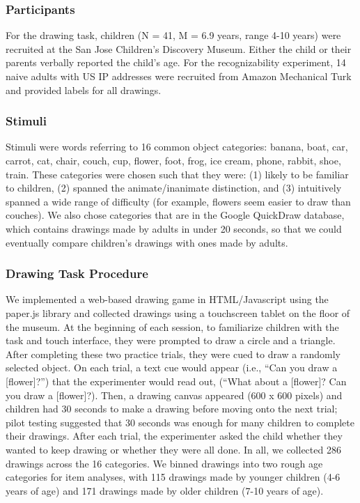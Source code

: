 \documentclass[10pt, letterpaper]{article}
\begin{document}
\subsubsection{Participants}\label{participants}

For the drawing task, children (N = 41, M = 6.9 years, range 4-10 years)
were recruited at the San Jose Children's Discovery Museum. Either the
child or their parents verbally reported the child's age. For the
recognizability experiment, 14 naive adults with US IP addresses were
recruited from Amazon Mechanical Turk and provided labels for all
drawings.

\subsubsection{Stimuli}\label{stimuli}

Stimuli were words referring to 16 common object categories: banana,
boat, car, carrot, cat, chair, couch, cup, flower, foot, frog, ice
cream, phone, rabbit, shoe, train. These categories were chosen such
that they were: (1) likely to be familiar to children, (2) spanned the
animate/inanimate distinction, and (3) intuitively spanned a wide range
of difficulty (for example, flowers seem easier to draw than couches).
We also chose categories that are in the Google QuickDraw database,
which contains drawings made by adults in under 20 seconds, so that we
could eventually compare children's drawings with ones made by adults.

\subsubsection{Drawing Task Procedure}\label{drawing-task-procedure}

We implemented a web-based drawing game in HTML/Javascript using the
paper.js library and collected drawings using a touchscreen tablet on
the floor of the museum. At the beginning of each session, to
familiarize children with the task and touch interface, they were
prompted to draw a circle and a triangle. After completing these two
practice trials, they were cued to draw a randomly selected object. On
each trial, a text cue would appear (i.e., ``Can you draw a
{[}flower{]}?'') that the experimenter would read out, (``What about a
{[}flower{]}? Can you draw a {[}flower{]}?). Then, a drawing canvas
appeared (600 x 600 pixels) and children had 30 seconds to make a
drawing before moving onto the next trial; pilot testing suggested that
30 seconds was enough for many children to complete their drawings.
After each trial, the experimenter asked the child whether they wanted
to keep drawing or whether they were all done. In all, we collected 286
drawings across the 16 categories. We binned drawings into two rough age
categories for item analyses, with 115 drawings made by younger children
(4-6 years of age) and 171 drawings made by older children (7-10 years
of age).
\end{document}
